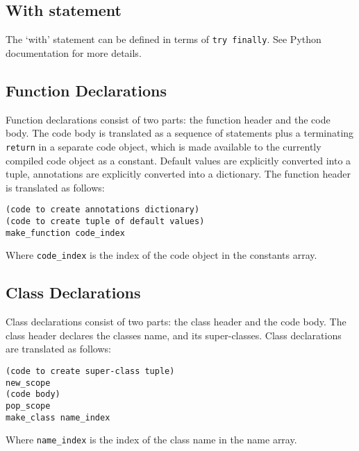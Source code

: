 \documentclass[a4paper,10pt]{article}
\begin{document}
\subsection{With statement}
The `with' statement can be defined in terms of \verb|try finally|. See Python documentation for more details. 

\subsection{Function Declarations}
Function declarations consist of two parts: the function header and the code body.
The code body is translated as a sequence of statements plus a terminating \verb|return| in a separate code object, which is made available to the currently compiled code object as a constant.
Default values are explicitly converted into a tuple, annotations are explicitly converted into a dictionary.
The function header is translated as follows:
\begin{verbatim}
(code to create annotations dictionary)
(code to create tuple of default values)
make_function code_index
\end{verbatim}
Where \verb|code_index| is the index of the code object in the constants array.

\subsection{Class Declarations}
Class declarations consist of two parts: the class header and the code body. The class header declares the classes name, and its super-classes.
Class declarations are translated as follows:
\begin{verbatim}
(code to create super-class tuple)
new_scope
(code body)
pop_scope
make_class name_index
\end{verbatim}
Where \verb|name_index| is the index of the class name in the name array.
\end{document}
